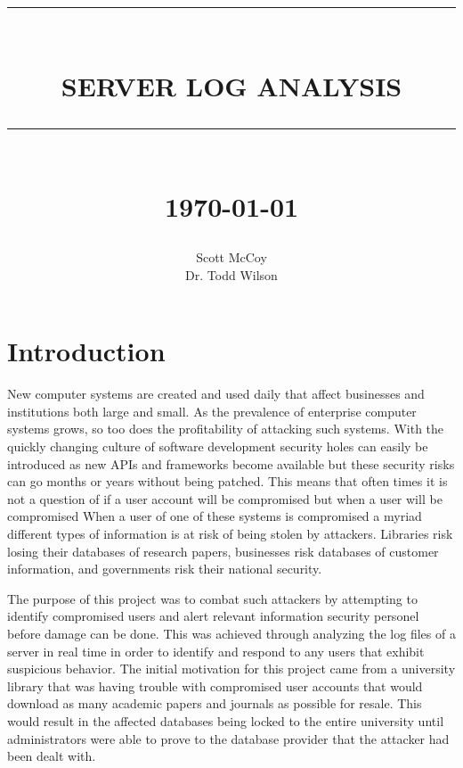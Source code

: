 \documentclass[12pt]{report}
\newcommand{\HRule}[1]{\rule{\linewidth}{#1}}
\begin{document}
\title{ \normalsize \textsc{}
        \\ [2.0cm]
        \HRule{0.5pt} \\
        \LARGE \textbf{\uppercase{Server Log Analysis}}
        \HRule{2pt} \\ [0.5cm]
        \normalsize \today \vspace*{5\baselineskip}}

\date{}

\author{
        Scott McCoy \\ 
        Dr. Todd Wilson\\
       	}

\maketitle


\sectionfont{\scshape}


\section*{Introduction}

New computer systems are created and used daily that affect businesses and 
institutions both large and small. As the prevalence of enterprise computer 
systems grows, so too does the profitability of attacking such systems. With
the quickly changing culture of software development security holes can easily be
introduced as new APIs and frameworks become available but these security risks
can go months or years without being patched. This means that often times it is not
a question of if a user account will be compromised but when a user will be compromised
When a user of one of these systems is compromised a myriad different 
types of information is at risk of being stolen by attackers. Libraries 
risk losing their databases of research papers, businesses risk databases
of customer information, and governments risk their national security.

The purpose of this project was to combat such attackers by attempting to identify
compromised users and alert relevant information security personel before damage 
can be done. This was achieved through analyzing the log files of a server in real
time in order to identify and respond to any users that exhibit suspicious behavior.
The initial motivation for this project came from a university library that was having
trouble with compromised user accounts that would download as many academic papers and 
journals as possible for resale. This would result in the affected databases being locked 
to the entire university until administrators were able to prove to the database provider 
that the attacker had been dealt with.
\end{document}
